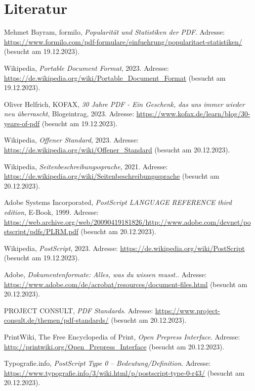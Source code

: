 \chapter*{Literatur}
\label{chap:literature}
%
\begin{referenceslist}
	\item Mehmet Bayram, formilo, \emph{Popularität und Statistiken der PDF}. Adresse: \url{https://www.formilo.com/pdf-formulare/einfuehrung/popularitaet-statistiken/} (besucht am 19.12.2023).
	
	\itema Wikipedia, \emph{Portable Document Format}, 2023. Adresse: \url{https://de.wikipedia.org/wiki/Portable_Document_Format} (besucht am 19.12.2023).
	
	\itemb Oliver Helfrich, KOFAX, \emph{30 Jahre PDF - Ein Geschenk, das uns immer wieder neu überrascht}, Blogeintrag, 2023. Adresse: \url{https://www.kofax.de/learn/blog/30-years-of-pdf} (besucht am 19.12.2023).
	
	\itemc Wikipedia, \emph{Offener Standard}, 2023. Adresse: \url{https://de.wikipedia.org/wiki/Offener_Standard} (besucht am 20.12.2023).
	
	\itemd Wikipedia, \emph{Seitenbeschreibungssprache}, 2021. Adresse: \url{https://de.wikipedia.org/wiki/Seitenbeschreibungssprache} (besucht am 20.12.2023). 
	
	\iteme Adobe Systems Incorporated, \emph{PostScript LANGUAGE REFERENCE third edition}, E-Book, 1999. Adresse: \url{https://web.archive.org/web/20090419181826/http://www.adobe.com/devnet/postscript/pdfs/PLRM.pdf} (besucht am 20.12.2023).
	
	\itemf Wikipedia, \emph{PostScript}, 2023. Adresse: \url{https://de.wikipedia.org/wiki/PostScript} (besucht am 19.12.2023).
	
	\itemg Adobe, \emph{Dokumentenformate: Alles, was du wissen musst.}. Adresse: \url{https://www.adobe.com/de/acrobat/resources/document-files.html} (besucht am 20.12.2023).
	
	\itemh PROJECT CONSULT, \emph{PDF Standards}. Adresse: \url{https://www.project-consult.de/themen/pdf-standards/} (besucht am 20.12.2023).
	
	\itemi PrintWiki, The Free Encyclopedia of Print, \emph{Open Prepress Interface}. Adresse: \url{http://printwiki.org/Open_Prepress_Interface} (besucht am 20.12.2023).
	
	\itemj Typografie.info, \emph{PostScript Type 0 – Bedeutung/Definition}. Adresse: \url{https://www.typografie.info/3/wiki.html/p/postscript-type-0-r43/} (besucht am 20.12.2023).
	

\end{referenceslist}
